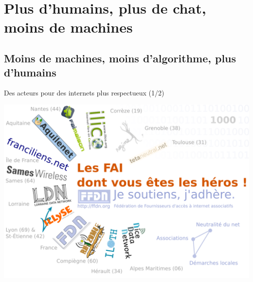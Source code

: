 \section[Plus d'humains, plus de chats, moins de machines]{Plus d'humains, plus de chat, moins de machines}

\subsection{Moins de machines, moins d'algorithme, plus d'humains}

\begin{frame}{Des acteurs pour des internets plus respectueux (1/2)}
  \begin{center}
    \includegraphics[height=0.8\textheight]{un_autre_internet/les_fai_dont_vous_etes.pdf}
  \end{center}
\end{frame}


